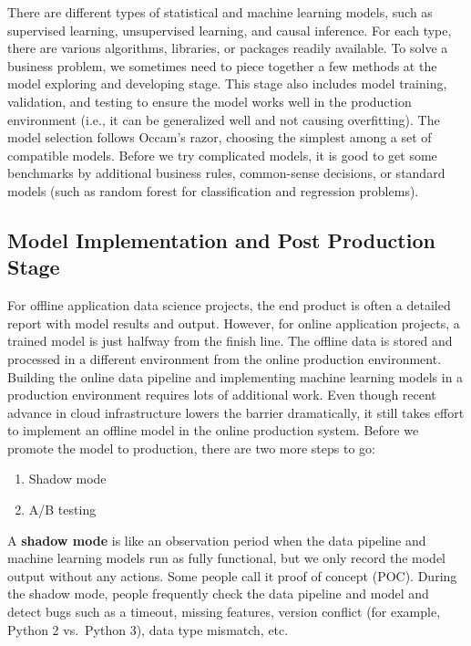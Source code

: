 \documentclass[
  12pt,
]{krantz}
\providecommand{\tightlist}{%
  \setlength{\itemsep}{0pt}\setlength{\parskip}{0pt}}
\begin{document}
There are different types of statistical and machine learning models, such as supervised learning, unsupervised learning, and causal inference. For each type, there are various algorithms, libraries, or packages readily available. To solve a business problem, we sometimes need to piece together a few methods at the model exploring and developing stage. This stage also includes model training, validation, and testing to ensure the model works well in the production environment (i.e., it can be generalized well and not causing overfitting). The model selection follows Occam's razor, choosing the simplest among a set of compatible models. Before we try complicated models, it is good to get some benchmarks by additional business rules, common-sense decisions, or standard models (such as random forest for classification and regression problems).

\hypertarget{model-implementation-and-post-production-stage}{%
\subsection{Model Implementation and Post Production Stage}\label{model-implementation-and-post-production-stage}}

For offline application data science projects, the end product is often a detailed report with model results and output. However, for online application projects, a trained model is just halfway from the finish line. The offline data is stored and processed in a different environment from the online production environment. Building the online data pipeline and implementing machine learning models in a production environment requires lots of additional work. Even though recent advance in cloud infrastructure lowers the barrier dramatically, it still takes effort to implement an offline model in the online production system. Before we promote the model to production, there are two more steps to go:

\begin{enumerate}
\def\labelenumi{\arabic{enumi}.}
\tightlist
\item
  Shadow mode
\item
  A/B testing
\end{enumerate}

A \textbf{shadow mode} is like an observation period when the data pipeline and machine learning models run as fully functional, but we only record the model output without any actions. Some people call it proof of concept (POC). During the shadow mode, people frequently check the data pipeline and model and detect bugs such as a timeout, missing features, version conflict (for example, Python 2 vs.~Python 3), data type mismatch, etc.
\end{document}

